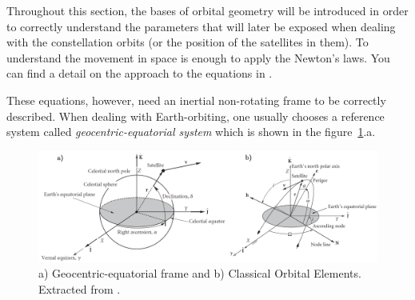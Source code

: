 Throughout this section, the bases of orbital geometry will be introduced in order to correctly understand the parameters that will later be exposed when dealing with the constellation orbits (or the position of the satellites in them). To understand the movement in space is enough to apply the Newton's laws. You can find a detail on the approach to the equations in \cite[Chapter 1, Section 2]{annex1}.

These equations, however, need an inertial non-rotating frame to be correctly described. When dealing with Earth-orbiting, one usually chooses a reference system called \textit{geocentric-equatorial system} which is shown in the figure~\ref{fig:eqframe}.a. 

\begin{figure}[H]
\centering
\includegraphics[scale=.28]{./Geometry/fig-Ch1-Geometry/COE&eqframe.png}
\caption[a) Geocentric-equatorial frame and b) Classical Orbital Elements]{a) Geocentric-equatorial frame and b) Classical Orbital Elements. Extracted from \cite{Howard}.}
\label{fig:eqframe}
\end{figure}

